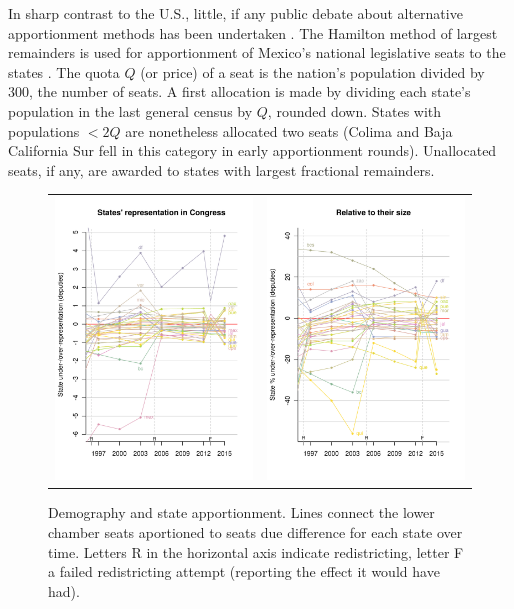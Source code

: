 \documentclass[letter,12pt]{article}
\begin{document}
In sharp contrast to the U.S., little, if any public debate about alternative apportionment methods has been undertaken \citep{szpiro.numbersRule.2010,balinski.rodriguez.1996}. The Hamilton method of largest remainders is used for apportionment of Mexico's national legislative seats to the states \citep[][:10]{balinskiYoung2001FairRep}. The quota $Q$ (or price) of a seat is the nation's population divided by 300, the number of seats. A first allocation is made by dividing each state's population in the last general census by $Q$, rounded down. States with populations $<2Q$ are nonetheless allocated two seats (Colima and Baja California Sur fell in this category in early apportionment rounds). Unallocated seats, if any, are awarded to states with largest fractional remainders. 

\begin{figure}
\begin{center}
  \begin{tabular}{cc}
    \includegraphics[width=.45\columnwidth]{statesUnderOverRep.pdf} & 
    \includegraphics[width=.45\columnwidth]{statesUnderOverRep-rel.pdf} \\ 
  \end{tabular}
  \caption{Demography and state apportionment. Lines connect the lower chamber seats aportioned to seats due difference for each state over time. Letters R in the horizontal axis indicate redistricting, letter F a failed redistricting attempt (reporting the effect it would have had).}\label{F:underOverRep}
\end{center}
\end{figure}
\end{document}
